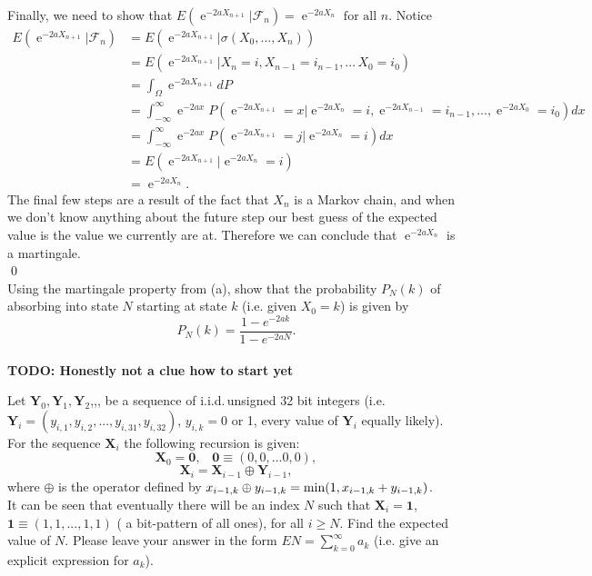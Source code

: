 \documentclass[10pt]{amsart}
\DeclareMathOperator{\E}{e}
\begin{document}
\noindent
Finally, we need to show that $E ( \E^{-2 a X_{n + 1}} | \mathcal F_n ) = \E^{-2 a X_n} \text{ for all } n$.
Notice
\begin{align*}
E ( \E^{-2 a X_{n + 1}}  | \mathcal F_n ) &= E ( \E^{-2 a X_{n + 1}}  | \sigma(X_0, ..., X_n) ) \\
	&= E ( \E^{-2 a X_{n + 1}}  | X_n = i, X_{n-1} = i_{n-1}, ... \, X_0 = i_0 ) \\
	&= \int_\Omega \E^{-2 a X_{n + 1}}  d P\\
	&= \int_{-\infty}^\infty \E^{-2 a x} P( \E^{-2 a X_{n + 1}} = x | \E^{-2 a X_n} = i, \E^{-2 a X_{n-1}} = i_{n-1}, ..., \E^{-2 a X_0} = i_0 ) dx \\
	&= \int_{-\infty}^\infty \E^{-2 a x} P( \E^{-2 a X_{n + 1}} = j | \E^{-2 a X_n} = i) dx \\
	&= E( \E^{-2 a X_{n + 1}} | \E^{-2 a X_n} = i) \\
	&= \E^{-2 a X_n}.
\end{align*}
The final few steps are a result of the fact that $X_n$ is a Markov chain, and when we don't know anything about the future step our best guess of the expected value is the value we currently are at.
Therefore we can conclude that $\E^{-2 a X_n}$ is a martingale. \\
\qed \\


  Using the martingale property from (a), show that the probability $P_N(k)$ of absorbing into state $N$ starting at state $k$ (i.e. given $X_0=k$) is given by
$$P_N(k)=\frac{1-e^{-2ak}}{1-e^{-2aN}}.$$ \\
\textbf{TODO: Honestly not a clue how to start yet}

\newpage

 Let ${\bm Y}_0, {\bm Y}_1, {\bm Y}_2$,,, be a sequence of i.i.d.\,unsigned 32 bit integers (i.e. ${\bm Y}_i=(y_{i,1},y_{i,2},...,y_{i,31},y_{i,32})$, $y_{i,k}=0$ or 1, every value of ${\bm Y}_i$ equally likely).
\\

\noindent For the sequence ${\bm X}_i$ the following recursion is given:
$${\bm X}_0={\bm 0}, \,\,\,\,\, {\bm 0}\equiv(0,0,...0,0),$$
$${\bm X}_i={\bm X}_{i-1} \oplus {\bm Y}_{i-1},$$
where $\oplus$ is the operator defined by $x_{i-1,k} \oplus y_{i-1,k}={\rm min}(1,x_{i-1,k}+y_{i-1,k})$.
\\

\noindent It can be seen that eventually there will be an index $N$ such that ${\bm X}_i={\bm 1}$, ${\bm 1}\equiv(1,1,...,1,1)$ ( a bit-pattern of all ones), for all $i\geq N$. Find the expected value of $N$. Please leave your answer in the form $EN=\sum_{k=0}^{\infty} a_k$ (i.e. give an explicit expression for $a_k$). \\ 
\end{document}
